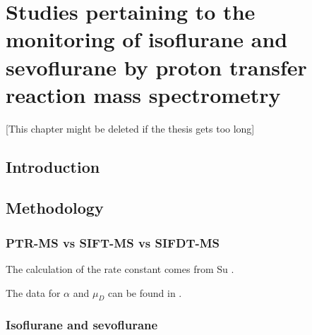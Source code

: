 

\chapter{Studies pertaining to the monitoring of isoflurane and sevoflurane by proton transfer reaction mass spectrometry}


[This chapter might be deleted if the thesis gets too long]


\section{Introduction}
\section{Methodology}
\subsection{PTR-MS vs SIFT-MS vs SIFDT-MS}






The calculation of the rate constant comes from Su \cite{su1994parametrization}.

The data for $\alpha$ and $\mu_D$ can be found in \cite{lide2012crc}.







\subsection{Isoflurane and sevoflurane}

